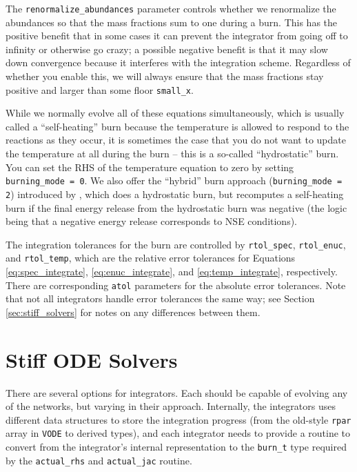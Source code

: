 The \texttt{renormalize\_abundances} parameter controls whether we renormalize
the abundances so that the mass fractions sum to one during a burn. This
has the positive benefit that in some cases it can prevent the integrator
from going off to infinity or otherwise go crazy; a possible negative benefit
is that it may slow down convergence because it interferes with the integration
scheme. Regardless of whether you enable this, we will always ensure that the
mass fractions stay positive and larger than some floor \texttt{small\_x}.

While we normally evolve all of these equations simultaneously, which is
usually called a ``self-heating'' burn because the temperature is allowed
to respond to the reactions as they occur, it is
sometimes the case that you do not want to update the temperature at all
during the burn -- this is a so-called ``hydrostatic'' burn. You can
set the RHS of the temperature equation to zero by setting
\texttt{burning\_mode = 0}. We also offer the ``hybrid'' burn approach
(\texttt{burning\_mode = 2}) introduced by \cite{raskin:2010}, which
does a hydrostatic burn, but recomputes a self-heating burn if the
final energy release from the hydrostatic burn was negative (the
logic being that a negative energy release corresponds to NSE conditions).

The integration tolerances for the burn are controlled by \texttt{rtol\_spec},
\texttt{rtol\_enuc}, and \texttt{rtol\_temp}, which are the relative error
tolerances for Equations \ref{eq:spec_integrate}, \ref{eq:enuc_integrate},
and \ref{eq:temp_integrate}, respectively. There are corresponding \texttt{atol}
parameters for the absolute error tolerances. Note that not all integrators
handle error tolerances the same way; see Section \ref{sec:stiff_solvers} for
notes on any differences between them.

\section{Stiff ODE Solvers}
\label{ch:networks:integrators}

There are several options for integrators.  Each should be capable of
evolving any of the networks, but varying in their approach.  Internally,
the integrators uses different data structures to store the integration
progress (from the old-style {\tt rpar} array in {\tt VODE} to derived
types), and each integrator needs to provide a routine to convert
from the integrator's internal representation to the {\tt burn\_t}
type required by the {\tt actual\_rhs} and {\tt actual\_jac} routine.

